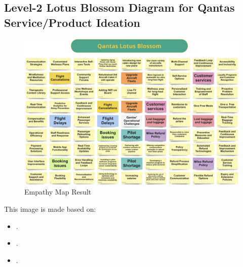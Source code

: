 \documentclass[12pt,a4paper]{article}
\begin{document}
\subsection{Level-2 Lotus Blossom Diagram for Qantas Service/Product Ideation}
\label{sec:Question 3}
\begin{figure}[htbp]
    \centering
    \includegraphics[width=1.0\textwidth]{images/Lotus Blossom.png}
    \caption{Empathy Map Result}
    \label{fig:example}
\end{figure}
This image is made based on:\\
\begin{itemize}
    \item \cite{Ref3.1}.
    \item \cite{Ref3.2}.
    \item \cite{Ref3.3}.    
\end{itemize}

\pagebreak
 



	
\def\UrlBreaks{\do\/\do-}

\clearpage
\end{document}
